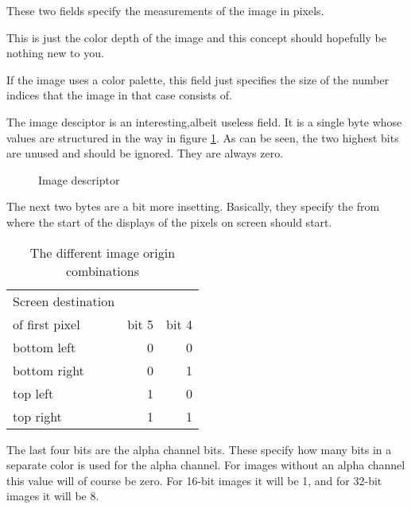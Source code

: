 \begin{refsection}

  These two fields specify the measurements of the image in pixels.


  This is just the color depth of the image and this concept should
  hopefully be nothing new to you.

  If the image uses a color palette, this field just specifies the
  size of the number indices that the image in that case consists of.


  The image desciptor is an interesting,albeit useless field. It is a
  single byte whose values are structured in the way in figure
  \ref{fig:tga-image-desc}. As can be seen, the two highest
  bits are unused and should be ignored. They are always zero.

  \begin{figure}[H]
    \centering
    \caption{Image descriptor}
    \label{fig:tga-image-desc}
  \end{figure}

  The next two bytes are a bit more insetting. Basically, they specify
  the from where the start of the displays of the pixels on screen
  should start.

  \begin{table}
    \centering
    \begin{tabular}{lrr}
      \toprule
      Screen destination \\ of first pixel & bit 5 & bit 4 \\
      \midrule
      bottom left & 0 & 0 \\
      bottom right & 0 & 1 \\
      top left & 1 & 0 \\
      top right & 1 & 1 \\
      \bottomrule
    \end{tabular}
    \caption{The different image origin combinations}
    \label{tab:image-origin}
  \end{table}

  The last four bits are the alpha channel bits. These specify how
  many bits in a separate color is used for the alpha channel. For
  images without an alpha channel this value will of course be
  zero. For 16-bit images it will be 1, and for 32-bit images it will
  be 8.


\end{refsection}
